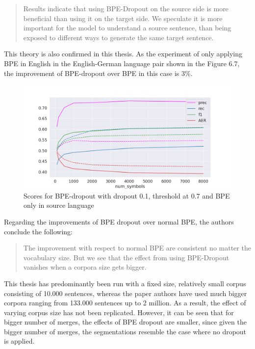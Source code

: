 \begin{quote}
	Results indicate that using BPE-Dropout on the source side is more beneficial than using it on the target side. We speculate it is more important for the model to understand a source sentence, than being exposed to different ways to generate the same target sentence.
\end{quote}

This theory is also confirmed in this thesis. As the experiment of only applying BPE in English in the English-German language pair shown in the Figure 6.7, the improvement of BPE-dropout over BPE in this case is 3\%.

\begin{figure}[!ht]
    \centering
    \includegraphics[width=12cm]{../reports/scores_dropout_bpe/space/0.1/eng_deu_0.7_thres_fastalign_eng.png}
    \caption{Scores for BPE-dropout with dropout 0.1, threshold at 0.7 and BPE only in source language}
\end{figure}

Regarding the improvements of BPE dropout over normal BPE, the authors conclude the following:

\begin{quote}
	The improvement with respect to normal BPE are consistent no matter the vocabulary size. But we see that the effect from using BPE-Dropout vanishes when a corpora size gets bigger.
\end{quote}

This thesis has predominantly been run with a fixed size, relatively small corpus consisting of 10.000 sentences, whereas the paper authors have used much bigger corpora ranging from 133.000 sentences up to 2 million. As a result, the effect of varying corpus size has not been replicated. However, it can be seen that for bigger number of merges, the effects of BPE dropout are smaller, since given the bigger number of merges, the segmentations resemble the case where no dropout is applied.

